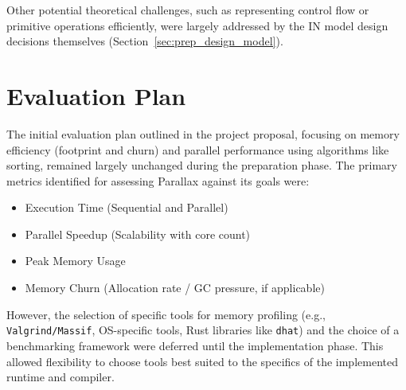 Other potential theoretical challenges, such as representing control flow or primitive operations efficiently, were largely addressed by the IN model design decisions themselves (Section~\ref{sec:prep_design_model}).

\section{Evaluation Plan}\label{sec:prep_evaluation} %
The initial evaluation plan outlined in the project proposal, focusing on memory efficiency (footprint and churn) and parallel performance using algorithms like sorting, remained largely unchanged during the preparation phase. The primary metrics identified for assessing Parallax against its goals were:
\begin{itemize}
    \item Execution Time (Sequential and Parallel)
    \item Parallel Speedup (Scalability with core count)
    \item Peak Memory Usage
    \item Memory Churn (Allocation rate / GC pressure, if applicable)
\end{itemize}
However, the selection of specific tools for memory profiling (e.g., \texttt{Valgrind/Massif}, OS-specific tools, Rust libraries like \texttt{dhat}) and the choice of a benchmarking framework were deferred until the implementation phase. This allowed flexibility to choose tools best suited to the specifics of the implemented runtime and compiler.
